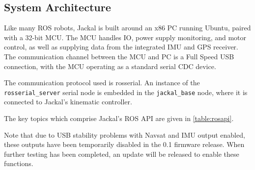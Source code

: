 \documentclass[]{clearpath-manual}
\begin{document}
\subsection{System Architecture}

Like many ROS robots, Jackal is built around an x86 PC running Ubuntu, paired with a
32-bit MCU. The MCU handles IO, power supply monitoring, and motor control, as well as
supplying data from the integrated IMU and GPS receiver. The communication channel
between the MCU and PC is a Full Speed USB connection, with the MCU operating as a
standard serial CDC device.

The communication protocol used is rosserial. An instance of the \lstinline{rosserial_server}
serial node is embedded in the \lstinline{jackal_base} node, where it is connected to
Jackal's kinematic controller.

The key topics which comprise Jackal's ROS API are given in \autoref{table:rosapi}.


\begin{warning}
Note that due to USB stability problems with Navsat and IMU output enabled, these outputs
have been temporarily disabled in the 0.1 firmware release. When further testing has been
completed, an update will be released to enable these functions.
\end{warning}
\end{document}
